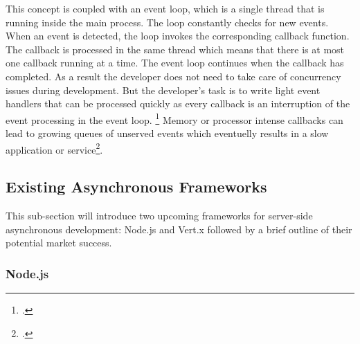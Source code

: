 This concept is coupled with an event loop, which is a single thread that is
running inside the main process.
The loop constantly checks for new events. When an event is detected, the loop
invokes the corresponding callback function. The callback is processed in the
same thread which means that there is at most one callback running at a time.
The event loop continues when the callback has completed. As a result the
developer does not need to take care of concurrency issues during development.
But the developer's task is to write light event handlers that can be processed
quickly as every callback is an interruption of the event processing in the
event loop. \footcite[Cf.][]{Croucher_2010} Memory or processor intense callbacks
can lead to growing queues of unserved events which eventuelly results
in a slow application or service\footcite[Cf.][48]{teixeira_2012}.





\subsection{Existing Asynchronous Frameworks}
\label{existing_frameworks}
This sub-section will introduce two upcoming frameworks for server-side asynchronous development: Node.js and Vert.x followed by a brief outline of their potential market success.

\subsubsection{Node.js}
\label{node.js}

